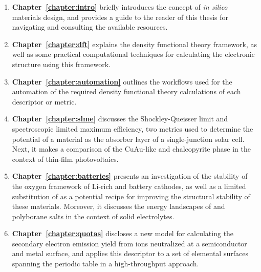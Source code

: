 \begin{enumerate}[]

\vfill
\item \textbf{Chapter~\ref{chapter:intro}} briefly introduces the concept of 
\textit{in silico} materials design, and provides a guide to the reader of 
this thesis for navigating and consulting the available resources.

\vfill
\item \textbf{Chapter~\ref{chapter:dft}} explains the density functional theory 
framework, as well as some practical computational techniques for calculating 
the electronic structure using this framework.

\vfill
\item \textbf{Chapter~\ref{chapter:automation}} outlines the workflows used for 
the automation of the required density functional theory calculations of each 
descriptor or metric.

\vfill
\item \textbf{Chapter~\ref{chapter:slme}} discusses the Shockley-Queisser limit 
and spectroscopic limited maximum efficiency, two metrics used to determine the 
potential of a material as the absorber layer of a single-junction solar cell. 
Next, it makes a comparison of the CuAu-like and chalcopyrite phase in the 
context of thin-film photovoltaics.

\vfill
\item \textbf{Chapter~\ref{chapter:batteries}} presents an investigation of the 
stability of the oxygen framework of Li-rich  and  
battery cathodes, as well as a limited substitution of  as a potential 
recipe for improving the structural stability of these materials. Moreover, it 
discusses the energy landscapes of  and  polyborane 
salts in the context of solid electrolytes.

\vfill
\item \textbf{Chapter~\ref{chapter:quotas}} discloses a new model for 
calculating the secondary electron emission yield from ions neutralized at a 
semiconductor and metal surface, and applies this descriptor to a set of 
elemental surfaces spanning the periodic table in a high-throughput approach.

\end{enumerate}

\afterpage{\null\newpage}
